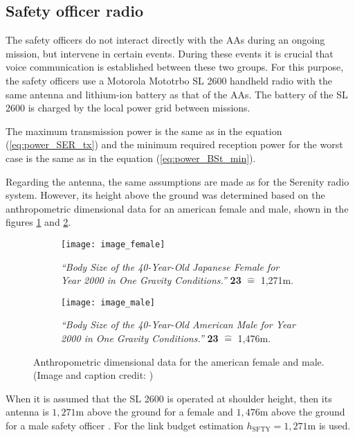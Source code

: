 \subsection{Safety officer radio}
The safety officers do not interact directly with the AAs during an ongoing mission, but intervene in certain events. During these events it is crucial that voice communication is established between these two groups. For this purpose, the safety officers use a Motorola Mototrbo SL 2600 handheld radio with the same antenna and lithium-ion battery as that of the AAs. The battery of the SL 2600 is charged by the local power grid between missions.

The maximum transmission power is the same as in the equation (\ref{eq:power_SER_tx}) and the minimum required reception power for the worst case is the same as in the equation (\ref{eq:power_BSt_min}).

Regarding the antenna, the same assumptions are made as for the Serenity radio system. However, its height above the ground was determined based on the anthropometric dimensional data for an american female and male, shown in the figures \ref{fig:image_female} and \ref{fig:image_male}.
\begin{figure}[h!]
	\centering
	\begin{subfigure}[b]{0.3\textwidth}
		\centering
		\texttt{[image: image\_female]}
		\caption{\textit{``Body Size of the 40-Year-Old Japanese Female for Year 2000 in One Gravity Conditions.''} \textbf{23} $\widehat{=}$ 1,271m.}
		\label{fig:image_female}
	\end{subfigure}
	\hspace{60pt}
	\begin{subfigure}[b]{0.3\textwidth}
		\centering
		\texttt{[image: image\_male]}
		\caption{\textit{``Body Size of the 40-Year-Old American Male for Year 2000 in One Gravity Conditions.''} \textbf{23} $\widehat{=}$ 1,476m.}
		\label{fig:image_male}
	\end{subfigure}
	\caption{Anthropometric dimensional data for the american female and male. (Image and caption credit: \cite{Hinker:2007, Adolf:2020})}
	\label{fig:bodies}
\end{figure}
When it is assumed that the SL 2600 is operated at shoulder height, then its antenna is $1,271\mathrm{m}$ above the ground for a female and $1,476\mathrm{m}$ above the ground for a male safety officer \cite{Hinker:2007, Adolf:2020}. For the link budget estimation $h_\mathrm{SFTY} = 1,271\mathrm{m}$ is used.